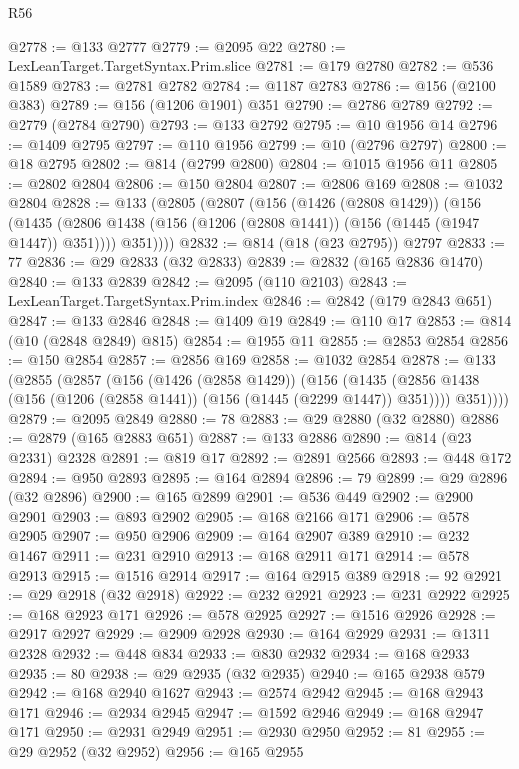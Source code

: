 \begin{lexlean}{R56}
\begin{coremodule}
@2778 := @133 @2777
@2779 := @2095 @22
@2780 := LexLeanTarget.TargetSyntax.Prim.slice
@2781 := @179 @2780
@2782 := @536 @1589
@2783 := @2781 @2782
@2784 := @1187 @2783
@2786 := @156 (@2100 @383)
@2789 := @156 (@1206 @1901) @351
@2790 := @2786 @2789
@2792 := @2779 (@2784 @2790)
@2793 := @133 @2792
@2795 := @10 @1956 @14
@2796 := @1409 @2795
@2797 := @110 @1956
@2799 := @10 (@2796 @2797)
@2800 := @18 @2795
@2802 := @814 (@2799 @2800)
@2804 := @1015 @1956 @11
@2805 := @2802 @2804
@2806 := @150 @2804
@2807 := @2806 @169
@2808 := @1032 @2804
@2828 := @133
    (@2805
      (@2807
        (@156
          (@1426 (@2808 @1429))
          (@156
            (@1435 (@2806 @1438 (@156 (@1206 (@2808 @1441)) (@156 (@1445 (@1947 @1447)) @351))))
            @351))))
@2832 := @814 (@18 (@23 @2795)) @2797
@2833 := 77
@2836 := @29 @2833 (@32 @2833)
@2839 := @2832 (@165 @2836 @1470)
@2840 := @133 @2839
@2842 := @2095 (@110 @2103)
@2843 := LexLeanTarget.TargetSyntax.Prim.index
@2846 := @2842 (@179 @2843 @651)
@2847 := @133 @2846
@2848 := @1409 @19
@2849 := @110 @17
@2853 := @814 (@10 (@2848 @2849) @815)
@2854 := @1955 @11
@2855 := @2853 @2854
@2856 := @150 @2854
@2857 := @2856 @169
@2858 := @1032 @2854
@2878 := @133
    (@2855
      (@2857
        (@156
          (@1426 (@2858 @1429))
          (@156
            (@1435 (@2856 @1438 (@156 (@1206 (@2858 @1441)) (@156 (@1445 (@2299 @1447)) @351))))
            @351))))
@2879 := @2095 @2849
@2880 := 78
@2883 := @29 @2880 (@32 @2880)
@2886 := @2879 (@165 @2883 @651)
@2887 := @133 @2886
@2890 := @814 (@23 @2331) @2328
@2891 := @819 @17
@2892 := @2891 @2566
@2893 := @448 @172
@2894 := @950 @2893
@2895 := @164 @2894
@2896 := 79
@2899 := @29 @2896 (@32 @2896)
@2900 := @165 @2899
@2901 := @536 @449
@2902 := @2900 @2901
@2903 := @893 @2902
@2905 := @168 @2166 @171
@2906 := @578 @2905
@2907 := @950 @2906
@2909 := @164 @2907 @389
@2910 := @232 @1467
@2911 := @231 @2910
@2913 := @168 @2911 @171
@2914 := @578 @2913
@2915 := @1516 @2914
@2917 := @164 @2915 @389
@2918 := 92
@2921 := @29 @2918 (@32 @2918)
@2922 := @232 @2921
@2923 := @231 @2922
@2925 := @168 @2923 @171
@2926 := @578 @2925
@2927 := @1516 @2926
@2928 := @2917 @2927
@2929 := @2909 @2928
@2930 := @164 @2929
@2931 := @1311 @2328
@2932 := @448 @834
@2933 := @830 @2932
@2934 := @168 @2933
@2935 := 80
@2938 := @29 @2935 (@32 @2935)
@2940 := @165 @2938 @579
@2942 := @168 @2940 @1627
@2943 := @2574 @2942
@2945 := @168 @2943 @171
@2946 := @2934 @2945
@2947 := @1592 @2946
@2949 := @168 @2947 @171
@2950 := @2931 @2949
@2951 := @2930 @2950
@2952 := 81
@2955 := @29 @2952 (@32 @2952)
@2956 := @165 @2955

\end{coremodule}
\end{lexlean}
